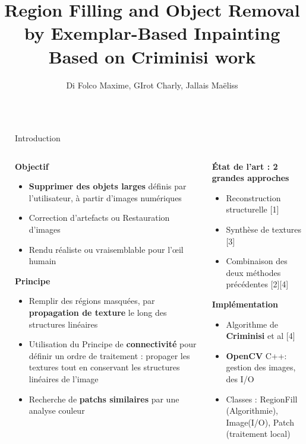 \documentclass[final,hyperref={pdfpagelabels=false}]{beamer}
\title{\huge  Region Filling and Object Removal by Exemplar-Based Inpainting \footnotesize
Based on Criminisi work }
\author{Di Folco Maxime, GIrot Charly, Jallais Maëliss}
\institute{Ecole Supérieure de Chimie Physique Électronique de Lyon}
\begin{document}
\begin{frame}[t]

\begin{columns}[t]
\begin{column}{.02\textwidth} \end{column}
\begin{column}{.930\textwidth} 
\begin{block}{\Large Introduction}

\begin{columns}[t]
\begin{column}{.4\textwidth}
\textbf{Objectif}
\begin{itemize} []
\item \textbf{Supprimer des objets larges} définis par l'utilisateur, à partir d'images numériques
\item Correction d'artefacts ou Restauration d'images
\item Rendu réaliste ou vraisemblable pour l'œil humain
\end{itemize}
\textbf{Principe}
\begin{itemize} 
\item Remplir des régions masquées, par \textbf{propagation de texture} le long des structures linéaires 
\item Utilisation du Principe de \textbf{connectivité} pour définir un ordre de traitement : propager les textures tout en conservant les structures linéaires de l'image
\item Recherche de \textbf{patchs similaires} par une analyse couleur
\end{itemize}
\end{column}



\begin{column}{.3\textwidth}

\textbf{État de l'art : 2 grandes approches}
\begin{itemize}
\item Reconstruction structurelle [1]
\item Synthèse de textures [3]
\item Combinaison des deux méthodes précédentes  [2][4]
\end{itemize}

\textbf{Implémentation}
\begin{itemize}
\item Algorithme de \textbf{Criminisi} et al [4]
\item \textbf{OpenCV} C++: gestion des images, des I/O
\item Classes : RegionFill (Algorithmie), Image(I/O), Patch (traitement local)
\end{itemize}


\end{column}
\end{columns}
\end{block}
\end{column}
\end{columns}
\end{frame}
\end{document}
